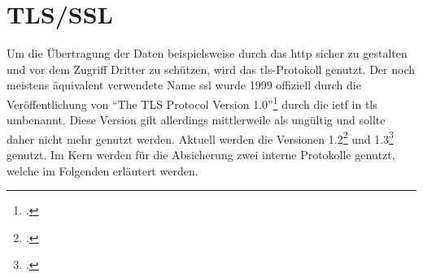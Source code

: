 \section{TLS/SSL}\label{sec:tls/ssl}

	Um die Übertragung der Daten beispielsweise durch das \gls{http} sicher zu gestalten
	und vor dem Zugriff Dritter zu schützen,
	wird das \gls{tls}-Protokoll genutzt.
	Der noch meistens äquivalent verwendete Name \gls{ssl} wurde 1999 offiziell
	durch die Veröffentlichung von \enquote{The TLS Protocol Version 1.0}\footcite[Vgl.][]{rfc2246}
	durch die \gls{ietf} in \gls{tls} umbenannt.
	Diese Version gilt allerdings mittlerweile als ungültig und sollte daher nicht mehr genutzt werden.
	Aktuell werden die Versionen 1.2\footcite[Vgl.][]{rfc5246} und 1.3\footcite[Vgl.][]{rfc8446} genutzt.
	Im Kern werden für die Absicherung zwei interne Protokolle genutzt,
	welche im Folgenden erläutert werden.

	
	